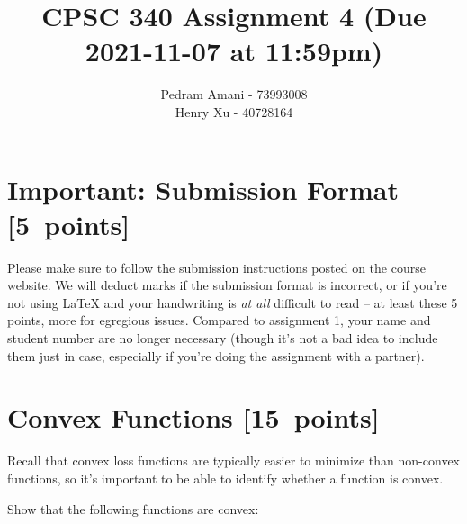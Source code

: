 \documentclass{article}
\newcommand{\blu}[1]{{\textcolor{blu}{#1}}}
\let\ask\blu
\newcommand\pts[1]{\textcolor{pointscolour}{[#1~points]}}
\begin{document}
\title{CPSC 340 Assignment 4 (Due 2021-11-07 at 11:59pm)}
\author{
        Pedram Amani - 73993008\\
        Henry Xu - 40728164
    }
\date{}
\maketitle



\section*{Important: Submission Format \pts{5}}

    Please make sure to follow the submission instructions posted on the course website.
    \ask{We will deduct marks if the submission format is incorrect, or if you're not using \LaTeX{} and your handwriting is \emph{at all} difficult to read} -- at least these 5 points, more for egregious issues.
    Compared to assignment 1, your name and student number are no longer necessary (though it's not a bad idea to include them just in case, especially if you're doing the assignment with a partner).

\section{Convex Functions \pts{15}}

Recall that convex loss functions are typically easier to minimize than non-convex functions, so it's important to be able to identify whether a function is convex.

\ask{Show that the following functions are convex}:
\end{document}
